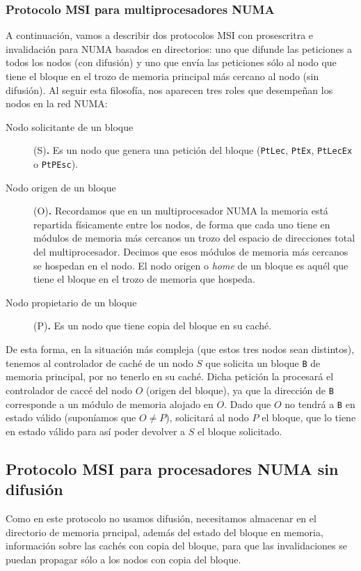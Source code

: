 \subsubsection{Protocolo MSI para multiprocesadores NUMA}
A continuación, vamos a describir dos protocolos MSI con prosescritra e invalidación para NUMA basados en directorios: uno que difunde las peticiones a todos los nodos (con difusión) y uno que envía las peticiones sólo al nodo que tiene el bloque en el trozo de memoria principal más cercano al nodo (sin difusión). Al seguir esta filosofía, nos aparecen tres roles que desempeñan los nodos en la red NUMA\@:
\begin{description}
    \item [Nodo solicitante de un bloque] (S)\textbf{.} Es un nodo que genera una petición del bloque (\verb|PtLec|, \verb|PtEx|, \verb|PtLecEx| o \verb|PtPEsc|).
    \item [Nodo origen de un bloque] (O)\textbf{.} Recordamos que en un multiprocesador NUMA la memoria está repartida físicamente entre los nodos, de forma que cada uno tiene en módulos de memoria más cercanos un trozo del espacio de direcciones total del multiprocesador. Decimos que esos módulos de memoria más cercanos se hospedan en el nodo. El nodo origen o \emph{home} de un bloque es aquél que tiene el bloque en el trozo de memoria que hospeda.
    \item [Nodo propietario de un bloque] (P)\textbf{.} Es un nodo que tiene copia del bloque en su caché.
\end{description}
De esta forma, en la situación más compleja (que estos tres nodos sean distintos), tenemos al controlador de caché de un nodo $S$ que solicita un bloque \verb|B| de memoria principal, por no tenerlo en su caché. Dicha petición la procesará el controlador de caccé del nodo $O$ (origen del bloque), ya que la dirección de \verb|B| corresponde a un módulo de memoria alojado en $O$. Dado que $O$ no tendrá a \verb|B| en estado válido (suponíamos que $O\neq P$), solicitará al nodo $P$ el bloque, que lo tiene en estado válido para así poder devolver a $S$ el bloque solicitado.

\subsection{Protocolo MSI para procesadores NUMA sin difusión}
Como en este protocolo no usamos difusión, necesitamos almacenar en el directorio de memoria prncipal, además del estado del bloque en memoria, información sobre las cachés con copia del bloque, para que las invalidaciones se puedan propagar sólo a los nodos con copia del bloque.

